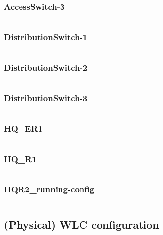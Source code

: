 \subsubsection{AccessSwitch-3} \label{configwlc}
\inputminted[fontsize=\tiny,linenos,breaklines]{text}{./Config/HQ/AccessSwitch-3.txt}
\subsubsection{DistributionSwitch-1} \label{configwlc}
\inputminted[fontsize=\tiny,linenos,breaklines]{text}{./Config/HQ/DistributionSwitch-1.txt}
\subsubsection{DistributionSwitch-2} \label{configwlc}
\inputminted[fontsize=\tiny,linenos,breaklines]{text}{./Config/HQ/DistributionSwitch-2.txt}
\subsubsection{DistributionSwitch-3} \label{configwlc}
\inputminted[fontsize=\tiny,linenos,breaklines]{text}{./Config/HQ/DistributionSwitch-3.txt}
\subsubsection{HQ\_ER1} \label{configwlc}
\inputminted[fontsize=\tiny,linenos,breaklines]{text}{./Config/HQ/HQ-ER1.txt}
\subsubsection{HQ\_R1} \label{configwlc}
\inputminted[fontsize=\tiny,linenos,breaklines]{text}{./Config/HQ/HQ-R1.txt}
\subsubsection{HQR2\_running-config} \label{configwlc}
\inputminted[fontsize=\tiny,linenos,breaklines]{text}{./Config/HQ/HQR2-running-config.txt}

\subsection{(Physical) WLC configuration} \label{configwlc}
\inputminted[fontsize=\tiny,linenos,breaklines]{text}{./wirelessimplementation/wlc.cisco}




